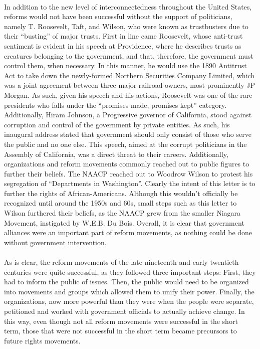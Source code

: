 \documentclass[12pt]{article}
\begin{document}
\paragraph{} In addition to the new level of interconnectedness throughout the United States, reforms would not have been successful without the support of politicians, namely T. Roosevelt, Taft, and Wilson, who were known as trustbusters due to their ``busting'' of major trusts. First in line came Roosevelt, whose anti-trust sentiment is evident in his speech at Providence, where he describes trusts as creatures belonging to the government, and that, therefore, the government must control them, when necessary. In this manner, he would use the 1890 Antitrust Act to take down the newly-formed Northern Securities Company Limited, which was a joint agreement between three major railroad owners, most prominently JP Morgan. As such, given his speech and his actions, Roosevelt was one of the rare presidents who falls under the ``promises made, promises kept'' category. Additionally, Hiram Johnson, a Progressive governor of California, stood against corruption and control of the government by private entities. As such, his inaugural address stated that government should only consist of those who serve the public and no one else. This speech, aimed at the corrupt politicians in the Assembly of California, was a direct threat to their careers. Additionally, organizations and reform movements commonly reached out to public figures to further their beliefs. The NAACP reached out to Woodrow Wilson to protest his segregation of ``Departments in Washington''. Clearly the intent of this letter is to further the rights of African-Americans. Although this wouldn't officially be recognized until around the 1950s and 60s, small steps such as this letter to Wilson furthered their beliefs, as the NAACP grew from the smaller Niagara Movement, instigated by W.E.B. Du Bois. Overall, it is clear that government alliances were an important part of reform movements, as nothing could be done without government intervention.

\paragraph{} As is clear, the reform movements of the late nineteenth and early twentieth centuries were quite successful, as they followed three important steps: First, they had to inform the public of issues. Then, the public would need to be organized into movements and groups which allowed them to unify their power. Finally, the organizations, now more powerful than they were when the people were separate, petitioned and worked with government officials to actually achieve change. In this way, even though not all reform movements were successful in the short term, those that were not successful in the short term became precursors to future rights movements.
\end{document}
